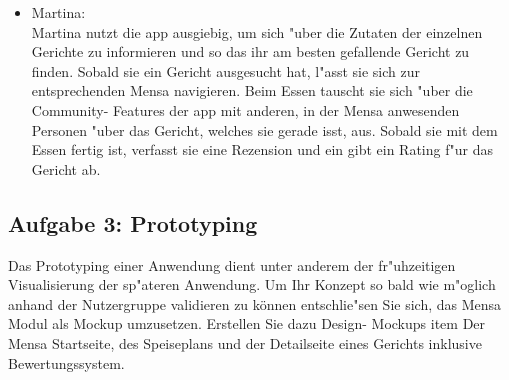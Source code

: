 \begin {enumerate}
\begin{itemize}
            Max m"ochte in der app schnell die im Moment g"unstigste Mensa finden, die f"ur ihn am schnellsten zu erreichen ist. 
            Hierf"ur sieht er sich zuerst die Mensa- "Ubersicht an und dann die jeweiligen Speisepl"ane. 
            Hat er dies erledigt, benutzt er die App, um sich zur Mensa seiner Wahl navigieren zu lassen. 
        \item Martina: \\
            Martina nutzt die app ausgiebig, um sich "uber die Zutaten der einzelnen Gerichte zu informieren und so das ihr am besten gefallende Gericht zu finden. 
            Sobald sie ein Gericht ausgesucht hat, l"asst sie sich zur entsprechenden Mensa navigieren.
            Beim Essen tauscht sie sich "uber die Community- Features der app mit anderen, in der Mensa anwesenden Personen "uber das Gericht, welches sie gerade isst, aus.
            Sobald sie mit dem Essen fertig ist, verfasst sie eine Rezension und ein gibt ein Rating f"ur das Gericht ab.
    \end{itemize}
\end {enumerate}

\subsection{Aufgabe 3: Prototyping  }
Das  Prototyping  einer  Anwendung  dient  unter  anderem  der  fr"uhzeitigen  Visualisierung  der sp"ateren Anwendung. 
Um Ihr Konzept so bald wie m"oglich anhand der Nutzergruppe validieren zu können entschlie"sen Sie sich, das Mensa Modul als Mockup umzusetzen.  
Erstellen  Sie  dazu  Design- Mockups item Der  Mensa  Startseite, des Speiseplans und der Detailseite eines Gerichts inklusive Bewertungssystem.

